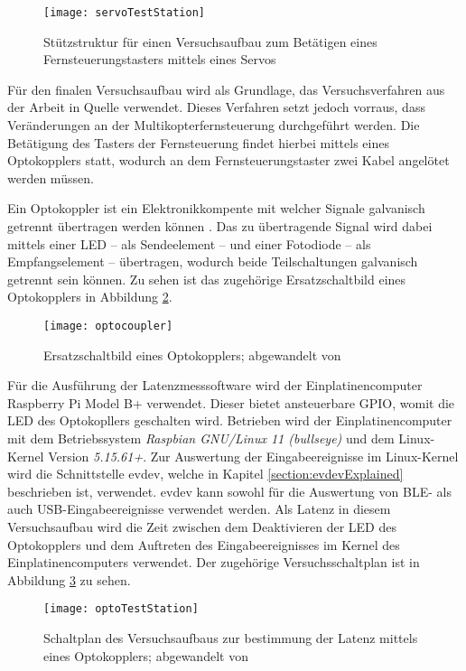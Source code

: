 \begin{figure}[H]
    \centering
    \texttt{[image: servoTestStation]}
    \caption{Stützstruktur für einen Versuchsaufbau zum Betätigen eines Fernsteuerungstasters mittels eines Servos}
    \label{fig:servoTestStation}
\end{figure}

Für den finalen Versuchsaufbau wird als Grundlage, das Versuchsverfahren aus der Arbeit in Quelle \cite{wimmerLatenzStation} verwendet. Dieses Verfahren setzt jedoch vorraus, dass Veränderungen an der Multikopterfernsteuerung durchgeführt werden. Die Betätigung des Tasters der Fernsteuerung findet hierbei mittels eines Optokopplers statt, wodurch an dem Fernsteuerungstaster zwei Kabel angelötet werden müssen.

Ein Optokoppler ist ein Elektronikkompente mit welcher Signale galvanisch getrennt übertragen werden können \cite{elektronikKompendiumOptokoppler}. Das zu übertragende Signal wird dabei mittels einer \ac{LED} -- als Sendeelement -- und einer Fotodiode -- als Empfangselement -- übertragen, wodurch beide Teilschaltungen galvanisch getrennt sein können. Zu sehen ist das zugehörige Ersatzschaltbild eines Optokopplers in Abbildung \ref{fig:optocoupler}.

\begin{figure}[H]
    \centering
    \texttt{[image: optocoupler]}
    \caption{Ersatzschaltbild eines Optokopplers; abgewandelt von \cite{altiumOptokoppler}}
    \label{fig:optocoupler}
\end{figure}

Für die Ausführung der Latenzmesssoftware wird der Einplatinencomputer Raspberry Pi Model B+ verwendet. Dieser bietet ansteuerbare \acs{GPIO}, womit die \ac{LED} des Optokopllers geschalten wird. Betrieben wird der Einplatinencomputer mit dem Betriebssystem \textit{Raspbian GNU/Linux 11 (bullseye)} und dem Linux-Kernel Version \textit{5.15.61+}. Zur Auswertung der Eingabeereignisse im Linux-Kernel wird die Schnittstelle evdev, welche in Kapitel \ref{section:evdevExplained} beschrieben ist, verwendet. evdev kann sowohl für die Auswertung von \ac{BLE}- als auch USB-Eingabeereignisse verwendet werden. Als Latenz in diesem Versuchsaufbau wird die Zeit zwischen dem Deaktivieren der \ac{LED} des Optokopplers und dem Auftreten des Eingabeereignisses im Kernel des Einplatinencomputers verwendet. Der zugehörige Versuchsschaltplan ist in Abbildung \ref{fig:optoTestStation} zu sehen.

\begin{figure}[H]
    \centering
    \texttt{[image: optoTestStation]}
    \caption{Schaltplan des Versuchsaufbaus zur bestimmung der Latenz mittels eines Optokopplers; abgewandelt von \cites{wimmerLatenzStation}[S.~8; S.~12]{LTV817}}
    \label{fig:optoTestStation}
\end{figure}

